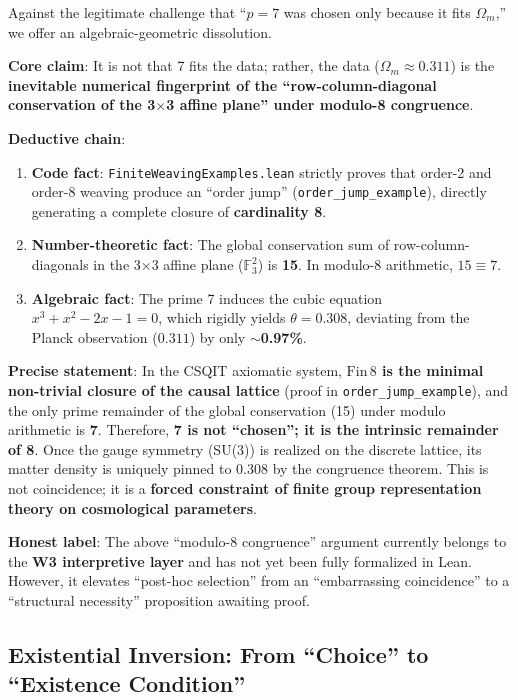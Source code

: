 \documentclass[aps,prd,twocolumn,nofootinbib,floatfix]{revtex4-2}
\begin{document}
Against the legitimate challenge that ``$p=7$ was chosen only because it fits $\Omega_m$,'' we offer an algebraic-geometric dissolution.

\textbf{Core claim}: It is not that 7 fits the data; rather, the data ($\Omega_m \approx 0.311$) is the \textbf{inevitable numerical fingerprint of the ``row-column-diagonal conservation of the 3$\times$3 affine plane'' under modulo-8 congruence}.

\textbf{Deductive chain}:
\begin{enumerate}
    \item \textbf{Code fact}: \texttt{FiniteWeavingExamples.lean} strictly proves that order-2 and order-8 weaving produce an ``order jump'' (\texttt{order\_jump\_example}), directly generating a complete closure of \textbf{cardinality 8}.
    \item \textbf{Number-theoretic fact}: The global conservation sum of row-column-diagonals in the 3$\times$3 affine plane ($\mathbb{F}_3^2$) is \textbf{15}. In modulo-8 arithmetic, $15 \equiv 7$.
    \item \textbf{Algebraic fact}: The prime 7 induces the cubic equation $x^3 + x^2 - 2x - 1 = 0$, which rigidly yields $\theta = 0.308$, deviating from the Planck observation ($0.311$) by only \textbf{$\sim$0.97\%}.
\end{enumerate}

\textbf{Precise statement}: In the CSQIT axiomatic system, \textbf{$\text{Fin}\,8$ is the minimal non-trivial closure of the causal lattice} (proof in \texttt{order\_jump\_example}), and the only prime remainder of the global conservation (15) under modulo arithmetic is \textbf{7}. Therefore, \textbf{7 is not ``chosen''; it is the intrinsic remainder of 8}. Once the gauge symmetry (SU(3)) is realized on the discrete lattice, its matter density is uniquely pinned to 0.308 by the congruence theorem. This is not coincidence; it is a \textbf{forced constraint of finite group representation theory on cosmological parameters}.

\medskip

\noindent\textbf{Honest label}: The above ``modulo-8 congruence'' argument currently belongs to the \textbf{W3 interpretive layer} and has not yet been fully formalized in Lean. However, it elevates ``post-hoc selection'' from an ``embarrassing coincidence'' to a ``structural necessity'' proposition awaiting proof.

\subsection{Existential Inversion: From ``Choice'' to ``Existence Condition''}
\end{document}
